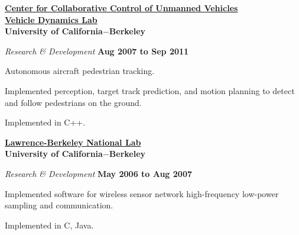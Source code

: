 \href{http://c3uv.berkeley.edu/}{\textbf{Center for Collaborative Control of Unmanned Vehicles}}\\
\href{http://vehicle.me.berkeley.edu/}{\textbf{Vehicle Dynamics Lab}}\\
\textbf{University of California$-$Berkeley}
\begin{outerlist}
\item[] \textit{Research \& Development}%
        \hfill \textbf{Aug 2007 to Sep 2011}
\begin{innerlist}
\item Autonomous aircraft pedestrian tracking.
\item Implemented perception, target track prediction, and motion planning to detect and follow pedestrians on the ground.
\item Implemented in C++.
\end{innerlist}
\end{outerlist}

\halfblankline

\href{http://www.lbl.gov/}{\textbf{Lawrence-Berkeley National Lab}}\\
\textbf{University of California$-$Berkeley}
\begin{outerlist}
\item[] \textit{Research \& Development}%
        \hfill \textbf{May 2006 to Aug 2007}
\begin{innerlist}
\item Implemented software for wireless sensor network high-frequency low-power sampling and communication.
\item Implemented in C, Java.
\end{innerlist}
\end{outerlist}

